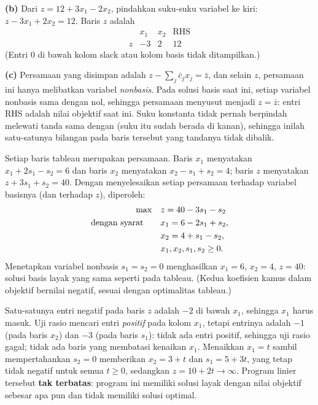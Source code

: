 \textbf{(b)} Dari $z = 12 + 3x_1 - 2x_2$, pindahkan suku-suku variabel ke kiri:
$z - 3x_1 + 2x_2 = 12$. Baris $z$ adalah
\[
\begin{array}{c|cc|c}
 & x_1 & x_2 & \text{RHS} \\
\hline
z & -3 & 2 & 12
\end{array}
\]
(Entri $0$ di bawah kolom slack atau kolom basis tidak ditampilkan.)

\textbf{(c)} Persamaan yang disimpan adalah
$z - \sum_j \bar c_j x_j = \bar z$, dan selain $z$, persamaan ini hanya
melibatkan variabel \emph{nonbasis}. Pada solusi basis saat ini, setiap variabel
nonbasis sama dengan nol, sehingga persamaan menyusut menjadi $z = \bar z$:
entri RHS adalah nilai objektif saat ini. Suku konstanta tidak pernah berpindah
melewati tanda sama dengan (suku itu sudah berada di kanan), sehingga inilah
satu-satunya bilangan pada baris tersebut yang tandanya tidak dibalik.


Setiap baris tableau merupakan persamaan. Baris $x_1$ menyatakan
$x_1 + 2s_1 - s_2 = 6$ dan baris $x_2$ menyatakan $x_2 - s_1 + s_2 = 4$;
baris $z$ menyatakan $z + 3s_1 + s_2 = 40$. Dengan menyelesaikan setiap
persamaan terhadap variabel basisnya (dan terhadap $z$), diperoleh:
\[
\begin{aligned}
\max\quad & z = 40 - 3s_1 - s_2 \\
\mbox{dengan syarat}\quad\quad & x_1 = 6 - 2s_1 + s_2, \\
& x_2 = 4 + s_1 - s_2, \\
& x_1, x_2, s_1, s_2 \geq 0.
\end{aligned}
\]
Menetapkan variabel nonbasis $s_1 = s_2 = 0$ menghasilkan $x_1 = 6$,
$x_2 = 4$, $z = 40$: solusi basis layak yang sama seperti pada tableau.
(Kedua koefisien kamus dalam objektif bernilai negatif, sesuai dengan
optimalitas tableau.)


Satu-satunya entri negatif pada baris $z$ adalah $-2$ di bawah $x_1$, sehingga
$x_1$ harus masuk. Uji rasio mencari entri \emph{positif} pada kolom $x_1$,
tetapi entrinya adalah $-1$ (pada baris $x_2$) dan $-3$ (pada baris $s_1$):
tidak ada entri positif, sehingga uji rasio gagal; tidak ada baris yang membatasi
kenaikan $x_1$. Menaikkan $x_1 = t$ sambil mempertahankan $s_2 = 0$ memberikan
$x_2 = 3 + t$ dan $s_1 = 5 + 3t$, yang tetap tidak negatif untuk semua
$t \geq 0$, sedangkan $z = 10 + 2t \to \infty$. Program linier tersebut
\textbf{tak terbatas}: program ini memiliki solusi layak dengan nilai objektif
sebesar apa pun dan tidak memiliki solusi optimal.

